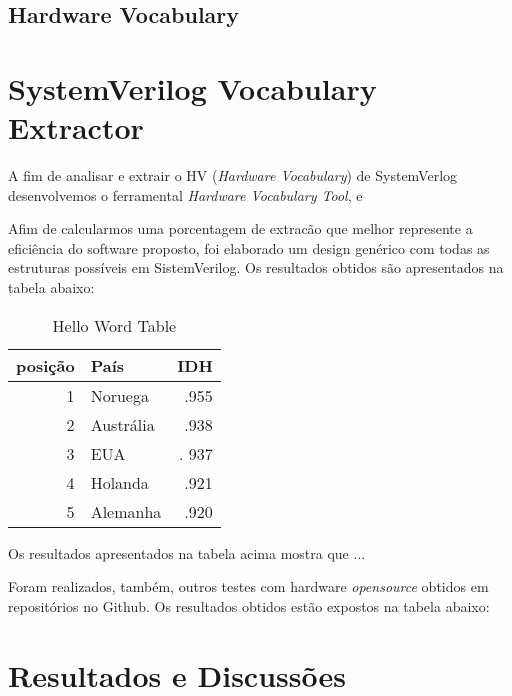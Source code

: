 \documentclass[12pt, twocolumn, a4paper]{article}
\begin{document}
	\subsection{Hardware Vocabulary} 
	\section{SystemVerilog Vocabulary Extractor}
	
\quad A fim de analisar e extrair o HV (\textit{Hardware Vocabulary}) de SystemVerlog desenvolvemos o ferramental \textit{Hardware 	 Vocabulary Tool}, e \cite{AST}
	
	
	\quad Afim de calcularmos uma porcentagem de extracão que melhor represente a eficiência do software proposto, foi elaborado um design genérico com todas as estruturas possíveis em SistemVerilog. Os resultados obtidos são apresentados na tabela abaixo:

\begin{table}[h]
\centering
\caption{Hello Word Table}
	\begin{tabular}{r|l|r}
	\hline
	posição & País & IDH\\
	\hline
	1 & Noruega        & .955 \\
	\hline
	2 & Austrália 	   & .938 \\
	\hline
	3 & EUA            &. 937 \\
	\hline
	4 & Holanda        & .921 \\
	\hline
	5 & Alemanha       & .920 \\
	\hline
	
	\end{tabular}

\end{table}

\quad Os resultados apresentados na tabela acima mostra que ...

	Foram realizados, também, outros testes com hardware \textit{opensource} obtidos em repositórios no Github. Os resultados obtidos estão expostos na tabela abaixo:
	\section{Resultados e Discussões}
	
\end{document}
